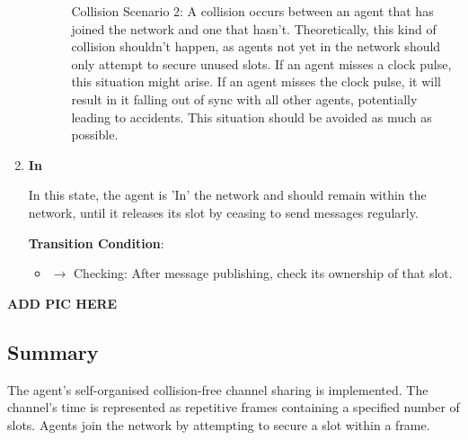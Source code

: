 \begin{enumerate}
\begin{itemize}
\begin{itemize}
            Collision Scenario 2: A collision occurs between an agent that has joined the network and one that hasn't. Theoretically, this kind of collision shouldn't happen, as agents not yet in the network should only attempt to secure unused slots. If an agent misses a clock pulse, this situation might arise. If an agent misses the clock pulse, it will result in it falling out of sync with all other agents, potentially leading to accidents. This situation should be avoided as much as possible.

        \end{itemize}
    \end{itemize}

    \item \textbf{In}
    
    In this state, the agent is 'In' the network and should remain within the network, until it releases its slot by ceasing to send messages regularly.
    
    \textbf{Transition Condition}:
    \begin{itemize}
        \item $\rightarrow$ Checking: After message publishing, check its ownership of that slot.
    \end{itemize}

\end{enumerate}

\textbf{ADD PIC HERE} %

\subsection{Summary}

The agent's self-organised collision-free channel sharing is implemented. The channel's time is represented as repetitive frames containing a specified number of slots. Agents join the network by attempting to secure a slot within a frame.

